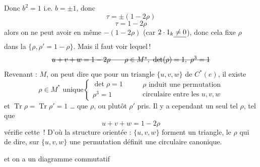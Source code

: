 \documentclass[11pt,a4paper]{article}
\begin{document}
Donc $b^2 = 1$ i.e. $b = \pm 1$, donc
\[
  \tau = \pm(1-2\rho)
\]
\[
  \tau = 1-2\rho
\]
alors on ne peut avoir en même  $-(1-2\rho)$ (car $2 \cdot 1_k \struck{{}\neq 0}$), donc cela fixe $\rho$ dans la  $\{\rho, \rho' = 1-\rho\}$. Mais il faut voir lequel\,!  \struck{\ill{}}
\[
  \text{\struck{$u+v+w = 1-2\rho \qquad \rho\in M^*,\ \det(\rho) = 1,\ \rho^3 = 1$}}
\]
Revenant : $M$, on peut dire que pour un triangle $\{u,v,w\}$ de $C^*(e)$, il existe
\[
  \rho\in M^* \text{ unique}
  \left\{
  \begin{array}{l}
    \det\rho = 1 \\
    \rho^3 = 1
  \end{array}
  \right.
  \qquad
  \begin{array}{l}
    \rho \text{ induit une permutation} \\
    \text{circulaire entre les } u, v, w
  \end{array}
\]
et \ill{} \ill{} $\operatorname{Tr}\rho = \operatorname{Tr}\rho' = 1$ \add{\ill{}}
… que $\rho$, ou plutôt  $\rho'$ pris. Il y a cependant un seul tel $\rho$, tel que
\[
  \boxed{\ u+v+w = 1-2\rho\ }
\]
vérifie  cette \,! D'où la structure \struck{\ill{}} orientée :  $\{u,v,w\}$ forment un triangle, \struck{\ill{}} le $\rho$ qui  de dire,  sur $\{u,v,w\}$ une permutation définit une  circulaire canonique.


et on a un  diagramme commutatif


\end{document}
